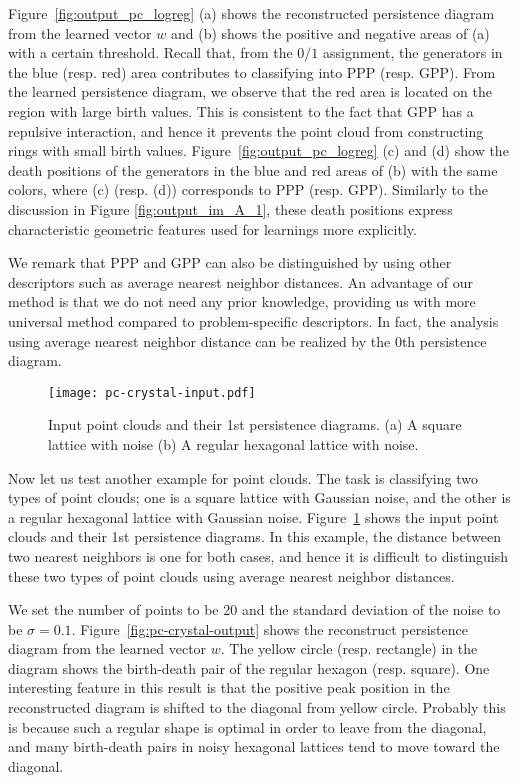 \documentclass[smallextended]{svjour3}
\begin{document}
Figure~\ref{fig:output_pc_logreg} (a) shows the reconstructed persistence diagram from the learned vector $w$ and (b) shows the positive and negative areas of (a) with a certain threshold. 
Recall that, from the $0/1$ assignment,  the generators in the blue (resp. red) area contributes to classifying into PPP (resp. GPP).
From the learned persistence diagram, we observe that the red area  is located on the region with large birth values. This is consistent to the fact that GPP has a repulsive interaction, and hence it prevents the point cloud from constructing rings with small birth values. Figure~\ref{fig:output_pc_logreg} (c) and (d) show the death positions of the generators in the blue and red areas of (b) with the same colors, where (c) (resp. (d)) corresponds to PPP (resp. GPP). Similarly to the discussion in Figure 
\ref{fig:output_im_A_1}, these death positions express characteristic geometric features used for learnings more explicitly. 








We remark that PPP and GPP can also be distinguished by using other descriptors such as average nearest neighbor distances. An advantage of our method is that we do not need any prior knowledge, providing us with more universal method compared to problem-specific descriptors. In fact, the analysis using average nearest neighbor distance can be realized by the $0$th persistence diagram. 

\begin{figure}[htbp]
  \centering
  \texttt{[image: pc-crystal-input.pdf]}
  \caption{Input point clouds and their 1st persistence diagrams.
  (a) A square lattice with noise (b) A regular hexagonal lattice with noise.}
  \label{fig:pc-crystal-input}
\end{figure}

Now let us test another example for point clouds. The task is classifying two types of point clouds; one is a square lattice with Gaussian noise, and the other is a regular hexagonal lattice with Gaussian noise. Figure~\ref{fig:pc-crystal-input} shows
the input point clouds and their 1st persistence diagrams. In this example, the distance between two nearest neighbors is one for both cases, and hence it is difficult to distinguish these two types of point clouds using average nearest neighbor distances. 


We set the number of points to be 20 and the standard deviation of the noise to be $\sigma = 0.1$. 
Figure~\ref{fig:pc-crystal-output} shows the reconstruct persistence diagram from the learned vector $w$.  The yellow circle (resp. rectangle) in the diagram shows the birth-death pair of the regular hexagon (resp. square).  One interesting feature in this result is that the positive peak position in the reconstructed diagram is shifted to the diagonal from yellow circle. Probably this is because such a regular shape is optimal in order to leave from the diagonal, and many birth-death pairs in noisy hexagonal lattices tend to move toward the diagonal. 
\end{document}
